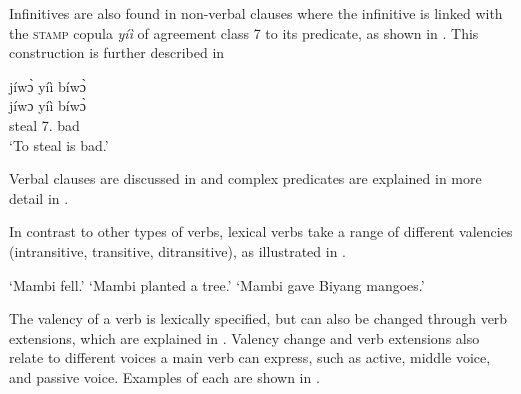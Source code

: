 Infinitives are also found in non-verbal clauses where the infinitive is linked with the \textsc{stamp} copula {\itshape yíì} of agreement class 7 to its predicate, as shown in . This construction is further described in 

\ea \label{INFcop}
  \glll  jíwɔ̀ yíì bíwɔ̀ \\
        jíwɔ yíì bíwɔ̀ \\
           steal 7.{\COP} bad  \\
    \trans `To steal is bad.'
\z

\noindent Verbal clauses are discussed in  and complex predicates are explained in more detail in .

In contrast to other types of verbs, lexical verbs take a range of different valencies (intransitive, transitive, ditransitive), as illustrated in .

\ea \label{Val}
    \trans `Mambi fell.'
    \trans `Mambi planted a tree.'
    \trans `Mambi gave Biyang mangoes.'
 \z
\z

The valency of a verb is lexically specified, but can also be changed through verb extensions, which are explained in . Valency change and verb extensions also relate to different voices a main verb can express, such as active, middle voice, and passive voice. Examples of each are shown in .

